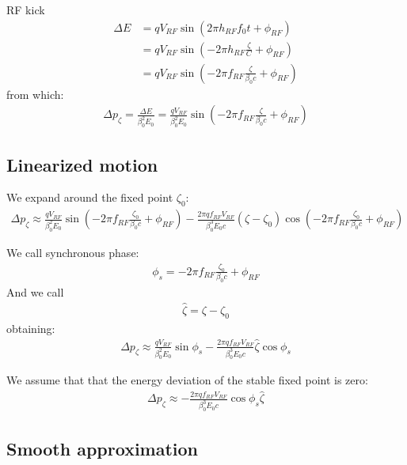 RF kick
\begin{align}
\Delta E
& = q V_{RF} \sin\left( 2 \pi h_{RF} f_0 t + \phi_{RF} \right)\\
& = q V_{RF} \sin\left(-2 \pi h_{RF} \frac{\zeta}{C} + \phi_{RF} \right)\\
& = q V_{RF} \sin\left(-2 \pi f_{RF} \frac{\zeta}{\beta_0 c} + \phi_{RF} \right)
\end{align}
from which:
\begin{align}
\Delta p_\zeta = \frac{\Delta E}{\beta_0^2E_0} 
= \frac{q V_{RF}}{\beta_0^2E_0}\sin\left(-2 \pi f_{RF} \frac{\zeta}{\beta_0 c} + \phi_{RF}\right)
\end{align}

\subsection{Linearized motion}

We expand around the fixed point $\zeta_0$:
\begin{align}
\Delta p_\zeta \approx \frac{q V_{RF}}{\beta_0^2E_0}\sin\left(-2 \pi f_{RF} \frac{\zeta_0}{\beta_0 c} + \phi_{RF}\right) -\frac{2\pi q f_{RF}V_{RF}}{\beta_0^3 E_0 c}(\zeta-\zeta_0)\cos\left(-2\pi f_{RF} \frac{\zeta_0}{\beta_0 c} + \phi_{RF}\right)
\end{align}

We call synchronous phase:
\begin{align}
\phi_s = -2 \pi f_{RF} \frac{\zeta_0}{\beta_0 c} + \phi_{RF}
\end{align}
And we call 
\begin{align}
\hat{\zeta}= \zeta - \zeta_0
\end{align}
obtaining:
\begin{align}
\Delta p_\zeta \approx \frac{q V_{RF}}{\beta_0^2E_0}\sin{\phi_s} -\frac{2\pi q f_{RF} V_{RF}}{\beta_0^3 E_0 c}\hat{\zeta}\cos{\phi_s}
\end{align}

We assume that that the energy deviation of the stable fixed point is zero:
\begin{align}
\Delta {p}_\zeta \approx -\frac{2\pi q f_{RF} V_{RF}}{\beta_0^3 E_0 c}\cos{\phi_s}\hat{\zeta}
\label{eq:deltapzeta}
\end{align}


\subsection{Smooth approximation}

